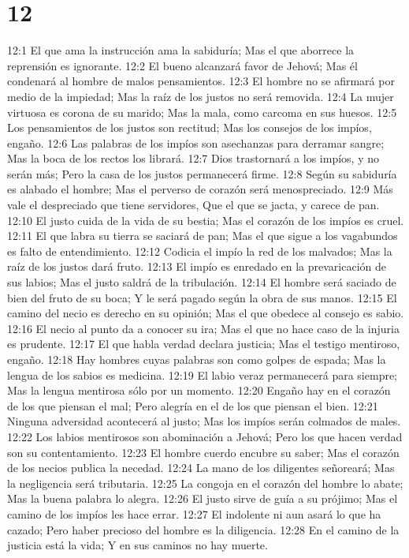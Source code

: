 \chapter{12}

12:1 El que ama la instrucción ama la sabiduría;  
Mas el que aborrece la reprensión es ignorante.  
12:2 El bueno alcanzará favor de Jehová;  
Mas él condenará al hombre de malos pensamientos.  
12:3 El hombre no se afirmará por medio de la impiedad;  
Mas la raíz de los justos no será removida.  
12:4 La mujer virtuosa es corona de su marido;  
Mas la mala, como carcoma en sus huesos.  
12:5 Los pensamientos de los justos son rectitud;  
Mas los consejos de los impíos, engaño.  
12:6 Las palabras de los impíos son asechanzas para derramar sangre;  
Mas la boca de los rectos los librará.  
12:7 Dios trastornará a los impíos, y no serán más;  
Pero la casa de los justos permanecerá firme.  
12:8 Según su sabiduría es alabado el hombre;  
Mas el perverso de corazón será menospreciado.  
12:9 Más vale el despreciado que tiene servidores,  
Que el que se jacta, y carece de pan.  
12:10 El justo cuida de la vida de su bestia;  
Mas el corazón de los impíos es cruel.  
12:11 El que labra su tierra se saciará de pan;  
Mas el que sigue a los vagabundos es falto de entendimiento.  
12:12 Codicia el impío la red de los malvados;  
Mas la raíz de los justos dará fruto.  
12:13 El impío es enredado en la prevaricación de sus labios;  
Mas el justo saldrá de la tribulación.  
12:14 El hombre será saciado de bien del fruto de su boca;  
Y le será pagado según la obra de sus manos. 
12:15 El camino del necio es derecho en su opinión;  
Mas el que obedece al consejo es sabio.  
12:16 El necio al punto da a conocer su ira;  
Mas el que no hace caso de la injuria es prudente.  
12:17 El que habla verdad declara justicia;  
Mas el testigo mentiroso, engaño.  
12:18 Hay hombres cuyas palabras son como golpes de espada;  
Mas la lengua de los sabios es medicina.  
12:19 El labio veraz permanecerá para siempre;  
Mas la lengua mentirosa sólo por un momento.  
12:20 Engaño hay en el corazón de los que piensan el mal;  
Pero alegría en el de los que piensan el bien.  
12:21 Ninguna adversidad acontecerá al justo;  
Mas los impíos serán colmados de males.  
12:22 Los labios mentirosos son abominación a Jehová;  
Pero los que hacen verdad son su contentamiento.  
12:23 El hombre cuerdo encubre su saber;  
Mas el corazón de los necios publica la necedad.  
12:24 La mano de los diligentes señoreará;  
Mas la negligencia será tributaria.  
12:25 La congoja en el corazón del hombre lo abate;  
Mas la buena palabra lo alegra.  
12:26 El justo sirve de guía a su prójimo;  
Mas el camino de los impíos les hace errar.  
12:27 El indolente ni aun asará lo que ha cazado;  
Pero haber precioso del hombre es la diligencia.  
12:28 En el camino de la justicia está la vida;  
Y en sus caminos no hay muerte.  

